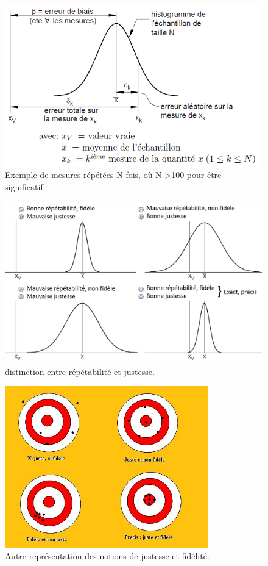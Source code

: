 \begin{figure}
\centering
\includegraphics[height=7cm]{assets/figures/3_7_Exemple_de_mesures_repetees_N_fois.PNG}
\caption{Exemple de mesures répétées N fois, où N >100 pour être significatif.}
\label{fig:Exemple_de_mesures_repetees_N_fois}
\end{figure}

\begin{figure}
\centering
\includegraphics[height=7cm]{assets/figures/3_8_distinction_entre_repetabiite_et_justesse.PNG}
\caption{distinction entre répétabilité et justesse.}
\label{fig:distinction_entre_repetabiite_et_justesse}
\end{figure}

\begin{figure}
\centering
\includegraphics[height=7cm]{assets/figures/3_8b_juste_fidele_precis.PNG}
\caption{Autre représentation des notions de justesse et fidélité.}
\label{fig:juste_fidele_precis}
\end{figure}

